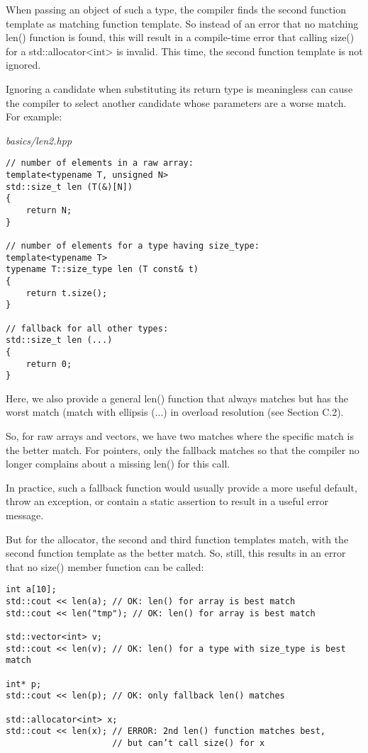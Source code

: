 When passing an object of such a type, the compiler finds the second function template as matching function template. So instead of an error that no matching len() function is found, this will result in a compile-time error that calling size() for a std::allocator<int> is invalid. This time, the second function template is not ignored.

Ignoring a candidate when substituting its return type is meaningless can cause the compiler to select another candidate whose parameters are a worse match. For example:

\noindent
\textit{basics/len2.hpp}
\begin{lstlisting}[style=styleCXX]
// number of elements in a raw array:
template<typename T, unsigned N>
std::size_t len (T(&)[N])
{
	return N;
}

// number of elements for a type having size_type:
template<typename T>
typename T::size_type len (T const& t)
{
	return t.size();
}

// fallback for all other types:
std::size_t len (...)
{
	return 0;
}
\end{lstlisting}

Here, we also provide a general len() function that always matches but has the worst match (match with ellipsis (...) in overload resolution (see Section C.2).

So, for raw arrays and vectors, we have two matches where the specific match is the better match. For pointers, only the fallback matches so that the compiler no longer complains about a missing len() for this call.

\begin{tcolorbox}[colback=webgreen!5!white,colframe=webgreen!75!black]
\hspace*{0.75cm}In practice, such a fallback function would usually provide a more useful default, throw an exception, or contain a static assertion to result in a useful error message.
\end{tcolorbox}

But for the allocator, the second and third function templates match, with the second function template as the better match. So, still, this results in an error that no size() member function can be called:

\begin{lstlisting}[style=styleCXX]
int a[10];
std::cout << len(a); // OK: len() for array is best match
std::cout << len("tmp"); // OK: len() for array is best match

std::vector<int> v;
std::cout << len(v); // OK: len() for a type with size_type is best match

int* p;
std::cout << len(p); // OK: only fallback len() matches

std::allocator<int> x;
std::cout << len(x); // ERROR: 2nd len() function matches best,
					 // but can’t call size() for x
\end{lstlisting}

